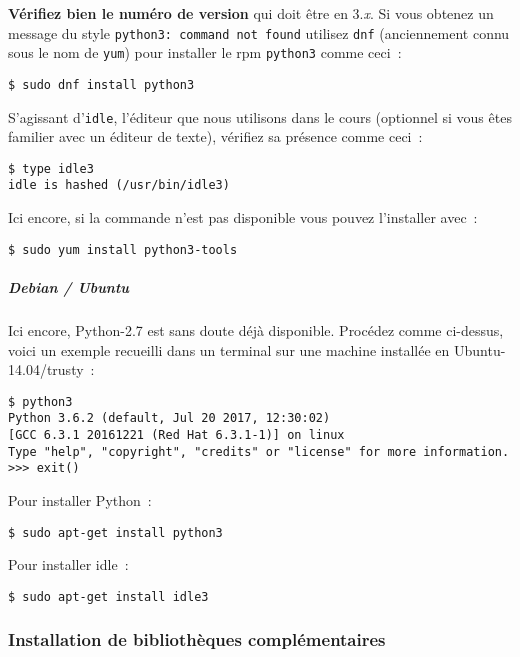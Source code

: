     \textbf{Vérifiez bien le numéro de version} qui doit être en 3.\emph{x}.
Si vous obtenez un message du style
\texttt{python3:\ command\ not\ found} utilisez \texttt{dnf}
(anciennement connu sous le nom de \texttt{yum}) pour installer le rpm
\texttt{python3} comme ceci~:

    \begin{verbatim}
$ sudo dnf install python3
\end{verbatim}

    S'agissant d'\texttt{idle}, l'éditeur que nous utilisons dans le cours
(optionnel si vous êtes familier avec un éditeur de texte), vérifiez sa
présence comme ceci~:

    \begin{verbatim}
$ type idle3
idle is hashed (/usr/bin/idle3)
\end{verbatim}

    Ici encore, si la commande n'est pas disponible vous pouvez l'installer
avec~:

    \begin{verbatim}
$ sudo yum install python3-tools
\end{verbatim}

    \hypertarget{debian-ubuntu}{%
\subparagraph{Debian / Ubuntu}\label{debian-ubuntu}}

    Ici encore, Python-2.7 est sans doute déjà disponible. Procédez comme
ci-dessus, voici un exemple recueilli dans un terminal sur une machine
installée en Ubuntu-14.04/trusty~:

    \begin{verbatim}
$ python3
Python 3.6.2 (default, Jul 20 2017, 12:30:02)
[GCC 6.3.1 20161221 (Red Hat 6.3.1-1)] on linux
Type "help", "copyright", "credits" or "license" for more information.
>>> exit()
\end{verbatim}

    Pour installer Python~:

    \begin{verbatim}
$ sudo apt-get install python3
\end{verbatim}

    Pour installer idle~:

    \begin{verbatim}
$ sudo apt-get install idle3
\end{verbatim}

    \hypertarget{installation-de-bibliothuxe8ques-compluxe9mentaires}{%
\subsubsection{Installation de bibliothèques
complémentaires}\label{installation-de-bibliothuxe8ques-compluxe9mentaires}}

